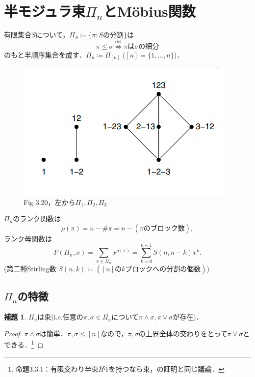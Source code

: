 \documentclass[xelatex,ja=standard,a4paper,14pt,everyparhook=compat]{bxjsarticle}
\theoremstyle{definition}
\newtheorem*{lemma*}{補題}
\begin{document}
\section{半モジュラ束$\Pi_n$とM\"obius関数}

有限集合$S$について，$\Pi_S \coloneqq \{\pi : \text{$S$の分割}\}$は \begin{equation*}
    \pi \leq \sigma \overset{\mathrm{def}}{\Longleftrightarrow} \text{$\pi$は$\sigma$の細分}
\end{equation*}
のもと半順序集合を成す．$\Pi_n \coloneqq \Pi_{[n]}$ ($[n] = \{1,\ldots,n\}$)．
\begin{figure}[h]
    \centering
    \includegraphics[width=.5\textwidth]{Fig3.20.png}
    \caption{Fig 3.20，左から$\Pi_1,\Pi_2,\Pi_3$}
\end{figure}

$\Pi_n$のランク関数は \begin{equation*}
    \rho(\pi) = n - \#\pi = n - (\text{$\pi$のブロック数}),
\end{equation*}
ランク母関数は \begin{equation*}
    F(\Pi_n, x) = \sum_{\pi \in \Pi_n} x^{\rho(\pi)} = \sum_{k=0}^{n-1} S(n,n-k) x^k.
\end{equation*}
(第二種Stirling数 $S(n,k) \coloneqq (\text{$[n]$の$k$ブロックへの分割の個数})$)

\newpage

\subsection{$\Pi_n$の特徴}

\begin{lemma*}
    $\Pi_n$は束(i.e.任意の$\pi,\sigma \in \Pi_n$について$\pi \land \sigma, \pi \lor \sigma$が存在)．
\end{lemma*}
\begin{proof}
    $\pi \land \sigma$は簡単．$\pi, \sigma \leq [n]$なので，$\pi, \sigma$の上界全体の交わりをとって$\pi \lor \sigma$とできる．\footnote{命題3.3.1：有限交わり半束が$\hat1$を持つなら束，の証明と同じ議論．}
\end{proof}
\end{document}

